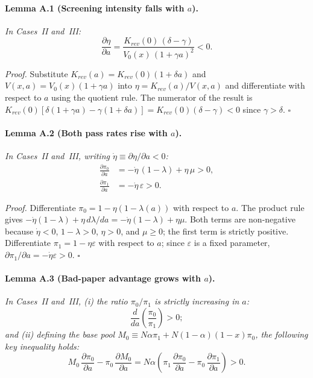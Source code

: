 \documentclass{article}
\begin{document}
\paragraph{Lemma A.1 (Screening intensity falls with $a$).}

\textit{In Cases~II and~III:}
\begin{equation}
  \label{eq:app_deta}
  \frac{\partial\eta}{\partial a}
  = \frac{K_{\mathit{rev}}(0)\,(\delta-\gamma)}{V_0(x)\,(1+\gamma a)^2} < 0.
\end{equation}

\noindent\textit{Proof.}
Substitute $K_{\mathit{rev}}(a) = K_{\mathit{rev}}(0)(1+\delta a)$ and $V(x,a) = V_0(x)(1+\gamma a)$ into $\eta = K_{\mathit{rev}}(a)/V(x,a)$ and differentiate with respect to $a$ using the quotient rule.
The numerator of the result is $K_{\mathit{rev}}(0)[\delta(1+\gamma a) - \gamma(1+\delta a)] = K_{\mathit{rev}}(0)(\delta - \gamma) < 0$ since $\gamma > \delta$.
\hfill$\square$

\paragraph{Lemma A.2 (Both pass rates rise with $a$).}

\textit{In Cases~II and~III, writing $\dot\eta \equiv \partial\eta/\partial a < 0$:}
\begin{align}
  \frac{\partial\pi_0}{\partial a} &= -\dot\eta\,(1-\lambda) + \eta\,\mu > 0,
    \label{eq:app_dpi0} \\
  \frac{\partial\pi_1}{\partial a} &= -\dot\eta\,\varepsilon > 0.
    \label{eq:app_dpi1}
\end{align}

\noindent\textit{Proof.}
Differentiate $\pi_0 = 1 - \eta(1-\lambda(a))$ with respect to $a$.
The product rule gives $-\dot\eta(1-\lambda) + \eta\,d\lambda/da = -\dot\eta(1-\lambda) + \eta\mu$.
Both terms are non-negative because $\dot\eta < 0$, $1-\lambda > 0$, $\eta > 0$, and $\mu \geq 0$; the first term is strictly positive.
Differentiate $\pi_1 = 1 - \eta\varepsilon$ with respect to $a$; since $\varepsilon$ is a fixed parameter, $\partial\pi_1/\partial a = -\dot\eta\varepsilon > 0$.
\hfill$\square$

\paragraph{Lemma A.3 (Bad-paper advantage grows with $a$).}

\textit{In Cases~II and~III, (i) the ratio $\pi_0/\pi_1$ is strictly increasing in $a$:}
\begin{equation}
  \frac{d}{da}\!\left(\frac{\pi_0}{\pi_1}\right) > 0;
  \label{eq:app_ratio}
\end{equation}
\textit{and (ii) defining the base pool $M_0 \equiv N\alpha\pi_1 + N(1-\alpha)(1-x)\pi_0$, the following key inequality holds:}
\begin{equation}
  M_0\,\frac{\partial\pi_0}{\partial a} - \pi_0\,\frac{\partial M_0}{\partial a}
  = N\alpha\!\left(\pi_1\,\frac{\partial\pi_0}{\partial a}
     - \pi_0\,\frac{\partial\pi_1}{\partial a}\right) > 0.
  \label{eq:app_key}
\end{equation}
\end{document}
